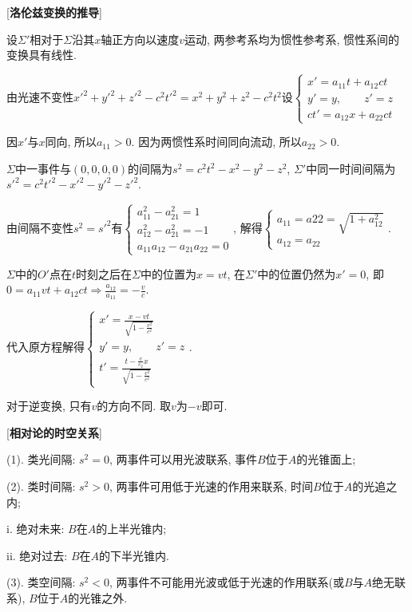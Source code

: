 [\textbf{洛伦兹变换的推导}]\par
\qquad 设$\Sigma'$相对于$\Sigma$沿其$x$轴正方向以速度$v$运动, 两参考系均为惯性参考系, 惯性系间的变换具有线性.\par
\qquad 由光速不变性$x'^2+y'^2+z'^2-c^2t'^2=x^2+y^2+z^2-c^2t^2$设$\begin{cases}x'=a_{11}t+a_{12}ct\\y'=y,\qquad z'=z\\ ct'=a_{12}x+a_{22}ct\end{cases}$\par
\qquad 因$x'$与$x$同向, 所以$a_{11}>0$. 因为两惯性系时间同向流动, 所以$a_{22}>0$.\par
\qquad $\Sigma$中一事件与$(0,0,0,0)$的间隔为$s^2=c^2t^2-x^2-y^2-z^2$, $\Sigma'$中同一时间间隔为$s'^2=c^2t'^2-x'^2-y'^2-z'^2$.\par
\qquad 由间隔不变性$s^2=s'^2$有$\begin{cases}a_{11}^2-a_{21}^2=1\\a_{12}^2-a_{21}^2=-1\\a_{11}a_{12}-a_{21}a_{22}=0\end{cases}$, 解得$\begin{cases}a_{11}=a{22}=\sqrt{1+a_{12}^2}\\a_12=a_22\end{cases}$.\par
\qquad $\Sigma$中的$O'$点在$t$时刻之后在$\Sigma$中的位置为$x=vt$, 在$\Sigma'$中的位置仍然为$x'=0$, 即$0=a_{11}vt+a_{12}ct\Rightarrow \frac{a_12}{a_11}=-\frac{v}{c}$.\par

\clearpage

\qquad 代入原方程解得$\begin{cases}x'=\frac{x-vt}{\sqrt{1-\frac{v^2}{c^2}}}\\y'=y,\qquad z'=z\\t'=\frac{t-\frac{v}{c_2}x}{\sqrt{1-\frac{v^2}{c^2}}}\end{cases}$.\par
\qquad 对于逆变换, 只有$v$的方向不同. 取$v$为$-v$即可.\par

[\textbf{相对论的时空关系}]\par
\qquad (1). 类光间隔: $s^2=0$, 两事件可以用光波联系, 事件$B$位于$A$的光锥面上;\par
\qquad (2). 类时间隔: $s^2>0$, 两事件可用低于光速的作用来联系, 时间$B$位于$A$的光追之内;\par
\qquad \qquad i. 绝对未来: $B$在$A$的上半光锥内;\par
\qquad \qquad ii. 绝对过去: $B$在$A$的下半光锥内.\par
\qquad (3). 类空间隔: $s^2<0$, 两事件不可能用光波或低于光速的作用联系(或$B$与$A$绝无联系), $B$位于$A$的光锥之外.\par

